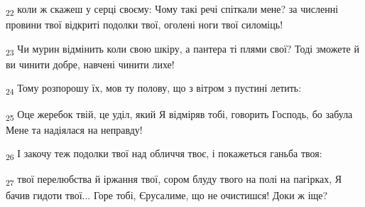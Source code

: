 \begin{tcolorbox}
\textsubscript{22} коли ж скажеш у серці своєму: Чому такі речі спіткали мене? за численні провини твої відкриті подолки твої, оголені ноги твої силоміць!
\end{tcolorbox}
\begin{tcolorbox}
\textsubscript{23} Чи мурин відмінить коли свою шкіру, а пантера ті плями свої? Тоді зможете й ви чинити добре, навчені чинити лихе!
\end{tcolorbox}
\begin{tcolorbox}
\textsubscript{24} Тому розпорошу їх, мов ту полову, що з вітром з пустині летить:
\end{tcolorbox}
\begin{tcolorbox}
\textsubscript{25} Оце жеребок твій, це уділ, який Я відміряв тобі, говорить Господь, бо забула Мене та надіялася на неправду!
\end{tcolorbox}
\begin{tcolorbox}
\textsubscript{26} І закочу теж подолки твої над обличчя твоє, і покажеться ганьба твоя:
\end{tcolorbox}
\begin{tcolorbox}
\textsubscript{27} твої перелюбства й іржання твої, сором блуду твого на полі на пагірках, Я бачив гидоти твої... Горе тобі, Єрусалиме, що не очистишся! Доки ж іще?
\end{tcolorbox}
